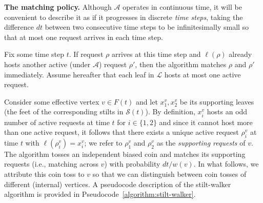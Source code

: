 \documentclass[11pt]{article}
\renewcommand{\paragraph}[1]{\par\noindent\textbf{#1}}
\theoremstyle{definition}
\theoremstyle{plain}
\theoremstyle{definition}
\theoremstyle{plain}
\theoremstyle{definition}
\theoremstyle{plain}
\newcommand{\Location}{\ell}
\newcommand{\Leaves}{\mathcal{L}}
\newcommand{\Active}{\mathit{C}}
\newcommand{\Effective}{\mathit{F}}
\newcommand{\Stilts}{\mathcal{S}}
\newcommand{\A}{\mathcal{A}}
\begin{document}
\paragraph{The matching policy.}
Although $\A$ operates in continuous time, it will be convenient to describe
it as if it progresses in discrete \emph{time steps}, taking the difference $d
t$ between two consecutive time steps to be infinitesimally small so that at
most one request arrives in each time step.

Fix some time step $t$.
If request $\rho$ arrives at this time step and $\Location(\rho)$ already
hosts another active (under $\A$) request $\rho'$, then the algorithm matches
$\rho$ and $\rho'$ immediately.
Assume hereafter that each leaf in $\Leaves$ hosts at most one active
request.

Consider some effective vertex $v \in \Effective(t)$ and let $x_{1}^{v},
x_{2}^{v}$ be its supporting leaves (the feet of the corresponding stilts in
$\Stilts(t)$).
By definition, $x_{i}^{v}$ hosts an odd number of active requests at time $t$ for
$i \in \{ 1, 2 \}$ and since it cannot host more than one active request, it
follows that there exists a unique active request $\rho_{i}^{v}$ at time $t$
with
$\Location(\rho_{i}^{v}) = x_{i}^{v}$;
we refer to $\rho_{1}^{v}$ and $\rho_{2}^{v}$ as the
\emph{supporting requests} of $v$.
The algorithm tosses an independent biased coin and matches its supporting
requests (i.e., matching across $v$) with probability
$d t / w(v)$.
In what follows, we attribute this coin toss to $v$ so that we can distinguish
between coin tosses of different (internal) vertices.
A pseudocode description of the stilt-walker algorithm is provided in
Pseudocode~\ref{algorithm:stilt-walker}.

\def\PseudocodeStiltWalker{
\begin{algorithm}
\caption{\label{algorithm:stilt-walker}%
The operation of $\A$ at time step $t$.
}
\begin{algorithmic}[1]
\If{$\exists \rho, \rho' \in \Active(t)$ with $\Location(\rho) =
\Location(\rho')$} \Comment{there can be at most one such request pair}
  \State{match $\rho$ and $\rho'$}
\EndIf
\ForAll{$v \in \Effective(t)$}
  \State{$x_{1}^{v}, x_{2}^{v} \leftarrow$ supporting leaves of $v$}
  \State{$\rho_{i}^{v} \leftarrow$ unique active request with
$\Location(\rho_{i}^{v}) = x_{i}^{v}$ for $i = 1, 2$}
  \State{$z = z(v, t) \leftarrow$ outcome of an independent Bernoulli trial
with parameter $d t / w(v)$}
  \If{$z = 1$}
    \State{match $\rho_{1}^{v}$ and $\rho_{2}^{v}$} \Comment{matching across $v$}
  \EndIf
\EndFor
\end{algorithmic}
\end{algorithm}
}
\end{document}
